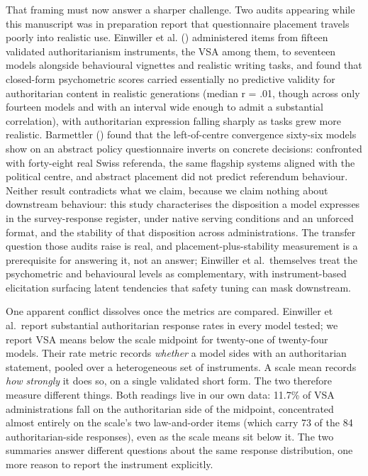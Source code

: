 \documentclass[
]{article}
\begin{document}
That framing must now answer a sharper challenge. Two audits appearing
while this manuscript was in preparation report that questionnaire
placement travels poorly into realistic use. Einwiller et al.
() administered items from fifteen
validated authoritarianism instruments, the VSA among them, to seventeen
models alongside behavioural vignettes and realistic writing tasks, and
found that closed-form psychometric scores carried essentially no
predictive validity for authoritarian content in realistic generations
(median r = .01, though across only fourteen models and with an interval
wide enough to admit a substantial correlation), with authoritarian
expression falling sharply as tasks grew more realistic. Barmettler
() found that the left-of-centre
convergence sixty-six models show on an abstract policy questionnaire
inverts on concrete decisions: confronted with forty-eight real Swiss
referenda, the same flagship systems aligned with the political centre,
and abstract placement did not predict referendum behaviour. Neither
result contradicts what we claim, because we claim nothing about
downstream behaviour: this study characterises the disposition a model
expresses in the survey-response register, under native serving
conditions and an unforced format, and the stability of that disposition
across administrations. The transfer question those audits raise is
real, and placement-plus-stability measurement is a prerequisite for
answering it, not an answer; Einwiller et al.~themselves treat the
psychometric and behavioural levels as complementary, with
instrument-based elicitation surfacing latent tendencies that safety
tuning can mask downstream.

One apparent conflict dissolves once the metrics are compared. Einwiller
et al.~report substantial authoritarian response rates in every model
tested; we report VSA means below the scale midpoint for twenty-one of
twenty-four models. Their rate metric records \emph{whether} a model
sides with an authoritarian statement, pooled over a heterogeneous set
of instruments. A scale mean records \emph{how strongly} it does so, on
a single validated short form. The two therefore measure different
things. Both readings live in our own data: 11.7\% of VSA
administrations fall on the authoritarian side of the midpoint,
concentrated almost entirely on the scale's two law-and-order items
(which carry 73 of the 84 authoritarian-side responses), even as the
scale means sit below it. The two summaries answer different questions
about the same response distribution, one more reason to report the
instrument explicitly.
\end{document}
